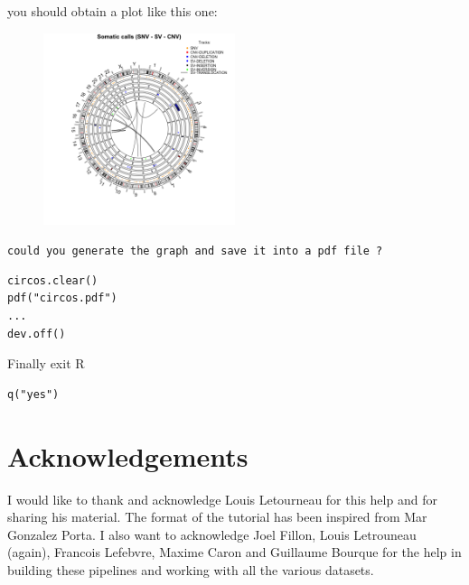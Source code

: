 you should obtain a plot like this one:
\begin{figure}[h]
\includegraphics[width=0.5\textwidth, inner]{circos.png}
\end{figure}

\begin{question}
\texttt{could you generate the graph and save it into a pdf file ?}
\end{question}

\begin{answer}
\begin{steps}
\begin{lstlisting}
circos.clear()
pdf("circos.pdf")
...
dev.off()
\end{lstlisting}
\end{steps}
\end{answer}

Finally exit R

\begin{steps}
\begin{lstlisting}
q("yes")
\end{lstlisting}
\end{steps}


\newpage


\section{Acknowledgements}
I would like to thank and acknowledge Louis Letourneau for this help and for sharing his material. The format of the tutorial has been inspired from Mar Gonzalez Porta. I also want to acknowledge Joel Fillon, Louis Letrouneau (again), Francois Lefebvre, Maxime Caron and Guillaume Bourque for the help in building these pipelines and working with all the various datasets.
